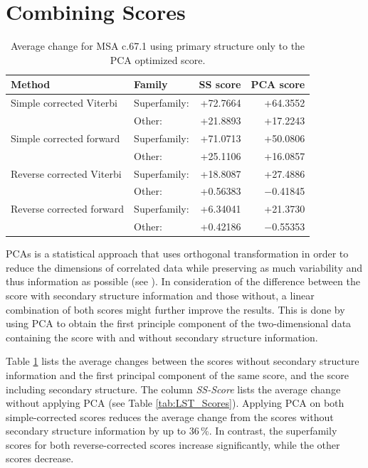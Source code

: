 

\section{Combining Scores}

\begin{table}[b]
	\centering
\begin{tabular}{|llrr|}
\hline
Method & Family & SS score \quad  & \qquad PCA score \\ \hline

Simple corrected Viterbi	& Superfamily: & +72.7664 & \qquad +64.3552 \\ 
    						& Other:       & +21.8893 &  +17.2243 \\ \hline
Simple corrected forward	& Superfamily: & +71.0713 &  +50.0806 \\ 
    						& Other:       & +25.1106 &  +16.0857 \\ \hline


Reverse corrected Viterbi	& Superfamily: \qquad \qquad & +18.8087  &  +27.4886 \\ 
    						& Other:       & +0.56383 &  $-$0.41845 \\ \hline
Reverse corrected forward \qquad	& Superfamily: & +6.34041 & +21.3730 \\ 
    						& Other:       & +0.42186 & $-$0.55353 \\ \hline
\end{tabular}
	\caption{Average change for \acs{MSA} c.67.1 using primary structure only to the \acs{PCA} optimized score.}
	\label{tab:LST_ScoresPCA}
\end{table}




\acp{PCA} is a statistical approach that uses orthogonal transformation in order to reduce the dimensions of correlated data while preserving as much variability and thus information as possible (see \citep{Dunteman.1989}).
In consideration of the difference between the score with secondary structure information and those without, a linear combination of both scores might further improve the results. 
This is done by using \ac{PCA} to obtain the first principle component  of the two-dimensional data containing the score with and without secondary structure information. 


Table \ref{tab:LST_ScoresPCA} lists the average changes between the scores without secondary structure information and the first principal component of the same score, and the score including secondary structure. The column \textit{SS-Score} lists the average change without applying \ac{PCA} (see Table \ref{tab:LST_Scores}). Applying \ac{PCA} on both simple-corrected scores reduces the average change from the scores without secondary structure information by up to 36\,\%. In contrast, the superfamily scores for both reverse-corrected scores increase significantly, while the other scores decrease. 

